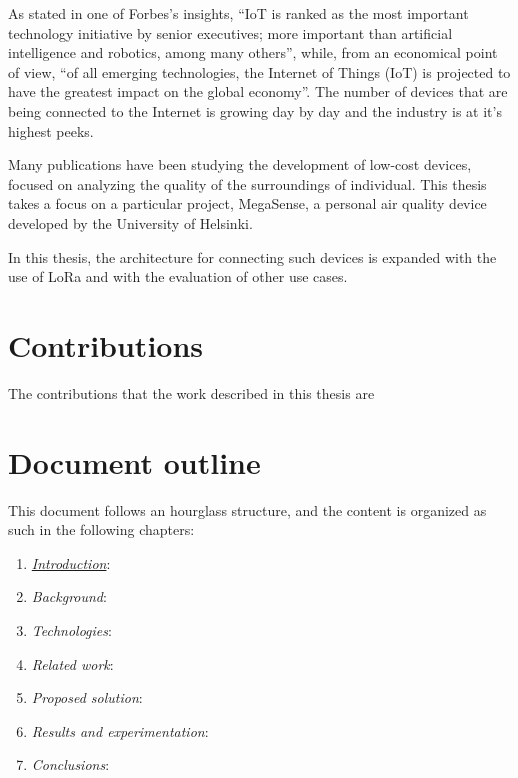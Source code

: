 	As stated in one of Forbes's insights, ``IoT is ranked as the most important technology initiative by senior executives; more important than artificial intelligence and robotics, among many others'', while, from an economical point of view, ``of all emerging technologies, the Internet of Things (IoT) is projected to have the greatest impact on the global economy''\cite{forbes}.
	The number of devices that are being connected to the Internet is growing day by day and the industry is at it's highest peeks.

	Many publications have been studying the development of low-cost devices, focused on analyzing the quality of the surroundings of individual. 
	This thesis takes a focus on a particular project, MegaSense, a personal air quality device developed by the University of Helsinki.
	
	In this thesis, the architecture for connecting such devices is expanded with the use of LoRa and with the evaluation of other use cases.
	
	
	\section{Contributions}\label{sec:contributions}
	
		The contributions that the work described in this thesis are
		
	
	\section{Document outline}\label{sec:document_outline}
		
		This document follows an hourglass structure, and the content is organized as such in the following chapters:
		
		\begin{enumerate}
			
			\item \hyperref[chapter:introduction]{\textit{Introduction}}:
			\item \textit{Background}:
			\item \textit{Technologies}:
			\item \textit{Related work}:
			\item \textit{Proposed solution}:
			\item \textit{Results and experimentation}:
			\item \textit{Conclusions}:
			
		\end{enumerate}